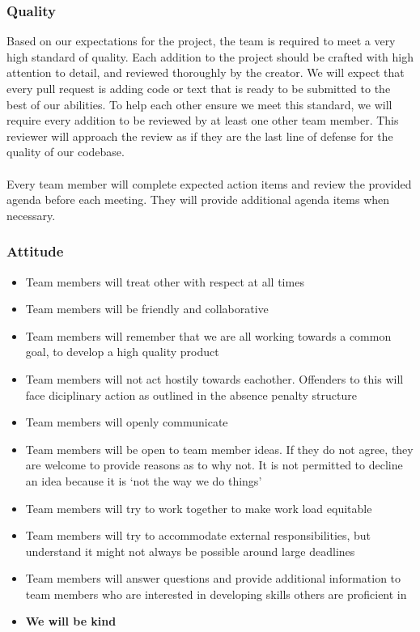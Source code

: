 \documentclass{article}
\begin{document}
\begin{itemize}
\subsubsection*{Quality} 
Based on our expectations for the project, the team is required to meet a very high standard of quality.
Each addition to the project should be crafted with high attention to detail, and reviewed thoroughly by the creator.
We will expect that every pull request is adding code or text that is ready to be submitted to the best of our abilities.
To help each other ensure we meet this standard, we will require every addition to be reviewed by at least one other team member.
This reviewer will approach the review as if they are the last line of defense for the quality of our codebase.\\\\
Every team member will complete expected action items and review the provided agenda before each meeting. They will provide additional agenda items when necessary.

\subsubsection*{Attitude}

\begin{itemize}
\item Team members will treat other with respect at all times
\item Team members will be friendly and collaborative
\item Team members will remember that we are all working towards a common goal, to develop a high quality product
\item Team members will not act hostily towards eachother. Offenders to this will face diciplinary action as outlined in the absence penalty structure
\item Team members will openly communicate
\item Team members will be open to team member ideas. If they do not agree, they are welcome to provide reasons as to why not. It is not permitted to decline an idea because it is `not the way we do things'
\item Team members will try to work together to make work load equitable
\item Team members will try to accommodate external responsibilities, but understand it might not always be possible around large deadlines
\item Team members will answer questions and provide additional information to team members who are interested in developing skills others are proficient in
\item \textbf{We will be kind}
\end{itemize}


\end{itemize}
\end{document}
